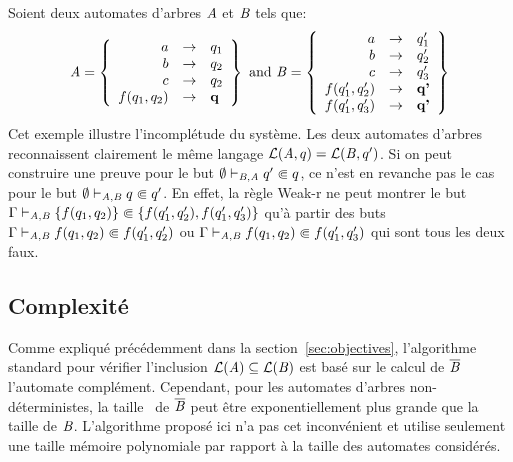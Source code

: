 \begin{example}
  Soient deux automates d'arbres $\mathit A$ et $\mathit B$ tels que:
  \[\mathit A = \left\{ 
    \begin{array}{rcl}
      a& \rightarrow &q_1\\
      b& \rightarrow &q_2\\
      c& \rightarrow &q_2\\
      f(q_1, q_2)&\rightarrow &{\textbf q}\\
    \end{array}\right\}
  \textrm { and }
  \mathit B = \left\{ 
    \begin{array}{rcl}
      a& \rightarrow &q_1'\\
      b& \rightarrow &q_2'\\
      c& \rightarrow &q_3'\\
      f(q_1', q_2')&\rightarrow &\textbf{q'}\\
      f(q_1', q_3')&\rightarrow &\textbf{q'}\\
    \end{array}\right\}
  \]
  Cet exemple illustre l'incomplétude du système. Les deux automates d'arbres reconnaissent 
  clairement le même langage $\mathcal{L}(\mathit A, q) = \mathcal{L}(\mathit B, q')$. Si on peut construire une preuve pour le but $\emptyset \vdash_{\mathit B, \mathit A} q' \Subset q$,
  ce n'est en revanche pas le cas pour le but $\emptyset \vdash_{\mathit A, \mathit B} q \Subset q'$. En effet, la règle Weak-r ne peut montrer 
  le but $\Gamma \vdash_{\mathit A, \mathit B} \{f(q_1, q_2)\} \Subset \{f(q_1', q_2'), f(q_1', q_3')\}$ qu'à partir des buts $\Gamma \vdash_{\mathit A, \mathit B} f(q_1, q_2) \Subset f(q_1', q_2')$
  ou $\Gamma \vdash_{\mathit A, \mathit B} f(q_1, q_2) \Subset f(q_1', q_3')$ qui sont tous les deux faux.
\end{example}



\subsection{Complexité}
Comme expliqué précédemment dans la section~\ref{sec:objectives}, l'algorithme standard pour
vérifier l'inclusion $\mathcal{L}(\mathit A) \subseteq \mathcal{L}(\mathit B)$ est basé sur le calcul de $\overline{\mathit B}$ l'automate complément.
Cependant, pour les automates d'arbres non-déterministes, la taille~\cite{TATA} de $\overline{\mathit B}$ peut être exponentiellement plus grande
que la taille de $\mathit B$. L'algorithme proposé ici n'a pas cet inconvénient et utilise seulement
une taille mémoire polynomiale par rapport à la taille des automates considérés.


